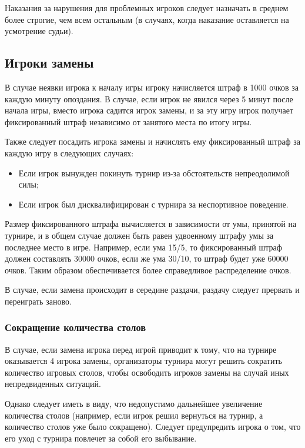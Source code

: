 Наказания за нарушения для проблемных игроков следует назначать в среднем более строгие, чем всем остальным (в случаях, когда наказание оставляется на усмотрение судьи).

\subsection{Игроки замены}

В случае неявки игрока к началу игры игроку начисляется штраф в 1000 очков за каждую минуту опоздания. В случае, если игрок не явился через 5 минут после начала игры, вместо игрока садится игрок замены, и за эту игру игрок получает фиксированный штраф независимо от занятого места по итогу игры.

Также следует посадить игрока замены и начислять ему фиксированный штраф за каждую игру в следующих случаях:
\begin{itemize}
	\item Если игрок вынужден покинуть турнир из-за обстоятельств непреодолимой силы;
	\item Если игрок был дисквалифицирован с турнира за неспортивное поведение.
\end{itemize}

Размер фиксированного штрафа вычисляется в зависимости от умы, принятой на турнире, и в общем случае должен быть равен удвоенному штрафу умы за последнее место в игре. Например, если ума 15/5, то фиксированный штраф должен составлять 30000 очков, если же ума 30/10, то штраф будет уже 60000 очков. Таким образом обеспечивается более справедливое распределение очков.

В случае, если замена происходит в середине раздачи, раздачу следует прервать и переиграть заново.

\subsubsection{Сокращение количества столов}

В случае, если замена игрока перед игрой приводит к тому, что на турнире оказывается 4 игрока замены, организаторы турнира могут решить сократить количество игровых столов, чтобы освободить игроков замены на случай иных непредвиденных ситуаций.

Однако следует иметь в виду, что недопустимо дальнейшее увеличение количества столов (например, если игрок решил вернуться на турнир, а количество столов уже было сокращено). Следует предупредить игрока о том, что его уход с турнира повлечет за собой его выбывание.

